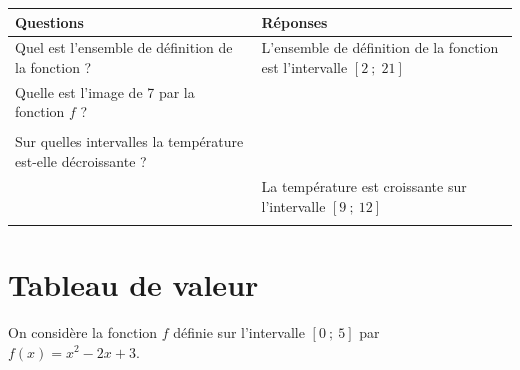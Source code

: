 \documentclass[10pt,a4paper]{article}
\begin{document}
\begin{enumerate}
        \begin{center}
    \begin{tabular}{|p{5cm}|p{10cm}|}
    \hline
    Questions & Réponses \\
    \hline
    \hline
    Quel est l'ensemble de définition de la fonction ? & L'ensemble de définition de la fonction est l'intervalle \([2\ ;\; 21]\) \\
    \hline
     Quelle est l'image de 7 par la fonction \(f\) ? &  \vspace{0.5cm}   \\
    \hline
    \vspace{0.5cm} &  \\
    \hline
    Sur quelles intervalles la température est-elle décroissante ? & \vspace{0.5cm} \\ 
    \hline
    \vspace{0.5cm}  & La température est croissante sur l'intervalle \([9\ ; \ 12]\)  \\ 
    \hline
     \vspace{0.5cm} &  \\
    \hline
    \end{tabular}
    \end{center}
    
\end{enumerate}

\section{Tableau de valeur}
On considère la fonction \(f\) définie sur l'intervalle \([0\ ;\ 5]\) par \(f(x)=x^2-2x+3\). 
\end{document}
